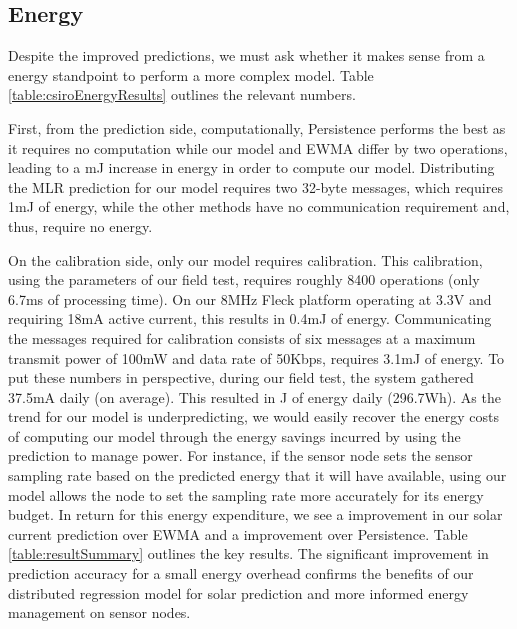 \documentclass[prodmode,acmtosn]{acmsmall}
\begin{document}
\subsection{Energy}
Despite the improved predictions, we must ask whether it makes sense from a energy standpoint to perform a more complex model.
Table \ref{table:csiroEnergyResults} outlines the relevant numbers.

First, from the prediction side, computationally, Persistence performs the best as it requires no computation while our model and EWMA differ by two operations, leading to a mJ increase in energy in order to compute our model.
Distributing the MLR prediction for our model requires two 32-byte messages, which requires 1mJ of energy, while the other methods have no communication requirement and, thus, require no energy.

On the calibration side, only our model requires calibration.
This calibration, using the parameters of our field test, requires roughly 8400 operations (only 6.7ms of processing time).
On our 8MHz Fleck platform operating at 3.3V and requiring 18mA active current, this results in 0.4mJ of energy.
Communicating the messages required for calibration consists of six messages at a maximum transmit power of 100mW and data rate of 50Kbps, requires 3.1mJ of energy.
To put these numbers in perspective, during our field test, the system gathered 37.5mA daily (on average).
This resulted in J of energy daily (296.7Wh).
As the trend for our model is underpredicting, we would easily recover the energy costs of computing our model through the energy savings incurred by using the prediction to manage power.
For instance, if the sensor node sets the sensor sampling rate based on the predicted energy that it will have available, using our model allows the node to set the sampling rate more accurately for its energy budget. 
In return for this energy expenditure, we see a  improvement in our solar current prediction over EWMA and a  improvement over Persistence.
Table \ref{table:resultSummary} outlines the key results.
The significant improvement in prediction accuracy for a small energy overhead confirms the benefits of our distributed regression model for solar prediction and more informed energy management on sensor nodes. \newline

\begin{table}
\centering
{}
\end{table}
\end{document}

